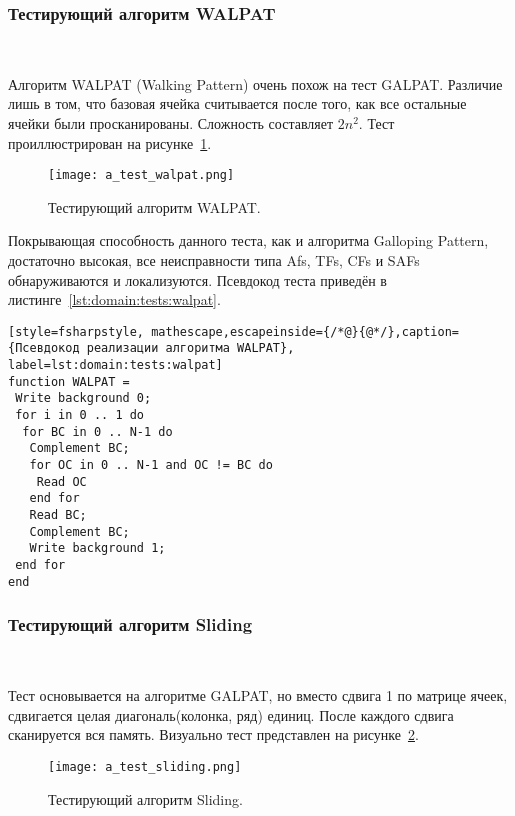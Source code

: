\subsubsection{Тестирующий алгоритм WALPAT}~\\
\label{sub:domain:tests:walpat}

Алгоритм WALPAT (Walking Pattern) очень похож на тест GALPAT. Различие лишь в том, что базовая ячейка считывается после того, как все остальные ячейки были просканированы. Сложность составляет $ 2n^{2} $. Тест проиллюстрирован на рисунке~\ref{fig:domain:tests:walpat}.

\begin{figure}[ht]
\centering
  \texttt{[image: a\_test\_walpat.png]}  
  \caption{ Тестирующий алгоритм WALPAT. }
  \label{fig:domain:tests:walpat}
\end{figure}

Покрывающая способность данного теста, как и алгоритма Galloping Pattern, достаточно высокая, все неисправности типа Afs, TFs, CFs и SAFs обнаруживаются и локализуются. Псевдокод теста приведён в листинге~\ref{lst:domain:tests:walpat}.

\begin{lstlisting}[style=fsharpstyle, mathescape,escapeinside={/*@}{@*/},caption={Псевдокод реализации алгоритма WALPAT}, label=lst:domain:tests:walpat]
function WALPAT =
 Write background 0;
 for i in 0 .. 1 do
  for BC in 0 .. N-1 do
   Complement BC;
   for OC in 0 .. N-1 and OC != BC do
    Read OC
   end for
   Read BC;
   Complement BC;
   Write background 1;
 end for
end
\end{lstlisting}

\subsubsection{Тестирующий алгоритм Sliding}~\\
\label{sub:domain:tests:sliding}

Тест основывается на алгоритме GALPAT, но вместо сдвига 1 по матрице ячеек, сдвигается целая диагональ(колонка, ряд) единиц. После каждого сдвига сканируется вся память. Визуально тест представлен на рисунке~\ref{fig:domain:tests:sliding}.

\begin{figure}[ht]
\centering
  \texttt{[image: a\_test\_sliding.png]}  
  \caption{ Тестирующий алгоритм Sliding. }
  \label{fig:domain:tests:sliding}
\end{figure} 

